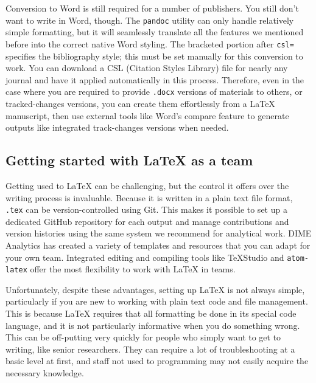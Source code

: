 
\noindent Conversion to Word is still required for a number of publishers.
You still don't want to write in Word, though.
The \texttt{pandoc} utility can only handle relatively simple formatting,
but it will seamlessly translate all the features we mentioned before
into the correct native Word styling.
The bracketed portion after \texttt{csl=} specifies the bibliography style;
this must be set manually for this conversion to work.
You can download a CSL (Citation Styles Library) file
for nearly any journal and have it applied automatically in this process.
Therefore, even in the case where you are required to provide
\texttt{.docx} versions of materials to others, or tracked-changes versions,
you can create them effortlessly from a {\LaTeX} manuscript,
then use external tools like Word's compare feature
to generate outputs like integrated track-changes versions when needed.


\subsection{Getting started with {\LaTeX} as a team}

Getting used to {\LaTeX} can be challenging,
but the control it offers over the writing process is invaluable.
Because it is written in a plain text file format,
\texttt{.tex} can be version-controlled using Git.
This makes it possible to set up a dedicated GitHub repository for each output
and manage contributions and version histories
using the same system we recommend for analytical work.
DIME Analytics has created a variety of templates and resources
that you can adapt for your own team.
Integrated editing and compiling tools like TeXStudio
and \texttt{atom-latex}
offer the most flexibility to work with {\LaTeX} in teams.

Unfortunately, despite these advantages, setting up {\LaTeX} is not always simple,
particularly if you are new to working with plain text code and file management.
This is because {\LaTeX} requires that all formatting be done in its special code language,
and it is not particularly informative when you do something wrong.
This can be off-putting very quickly for people
who simply want to get to writing, like senior researchers.
They can require a lot of troubleshooting at a basic level at first,
and staff not used to programming may not easily acquire the necessary knowledge.

